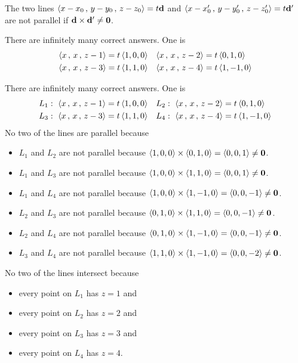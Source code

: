 \begin{hint}
The two lines $\left< x-x_0\,,\,y-y_0\,,\,z-z_0\right> =t\mathbf{d}$ and
$\left< x-x'_0\,,\,y-y'_0\,,\,z-z'_0\right> =t\mathbf{d}'$ are not parallel if
$\mathbf{d}\times\mathbf{d}'\ne\mathbf{0}$.
\end{hint}


\begin{answer}
There are infinitely many correct answers. One is
\begin{align*}
\left< x\,,\,x\,,\,z-1\right> &= t\left< 1,0,0\right> &
\left< x\,,\,x\,,\,z-2\right> &= t\left< 0,1,0\right> \\
\left< x\,,\,x\,,\,z-3\right> &= t\left< 1,1,0\right> &
\left< x\,,\,x\,,\,z-4\right> &= t\left< 1,-1,0\right> 
\end{align*}
 
\end{answer}
\begin{solution}
There are infinitely many correct answers. One is
\begin{align*}
L_1:\ \left< x\,,\,x\,,\,z-1\right> &= t\left< 1,0,0\right> &
L_2:\ \left< x\,,\,x\,,\,z-2\right> &= t\left< 0,1,0\right> \\
L_3:\ \left< x\,,\,x\,,\,z-3\right> &= t\left< 1,1,0\right> &
L_4:\ \left< x\,,\,x\,,\,z-4\right> &= t\left< 1,-1,0\right> 
\end{align*}
No two of the lines are parallel because
\begin{itemize}
\item
$L_1$ and $L_2$ are not parallel because
$\left< 1,0,0\right>\times \left< 0,1,0\right>=\left< 0,0,1\right>\ne\mathbf{0}$.
\item
$L_1$ and $L_3$ are not parallel because
$\left< 1,0,0\right>\times \left< 1,1,0\right>=\left< 0,0,1\right>\ne\mathbf{0}$.
\item
$L_1$ and $L_4$ are not parallel because
$\left< 1,0,0\right>\times \left< 1,-1,0\right>=\left< 0,0,-1\right>\ne\mathbf{0}$.
\item
$L_2$ and $L_3$ are not parallel because
$\left< 0,1,0\right>\times \left< 1,1,0\right>=\left< 0,0,-1\right>\ne\mathbf{0}$.
\item
$L_2$ and $L_4$ are not parallel because
$\left< 0,1,0\right>\times \left< 1,-1,0\right>=\left< 0,0,-1\right>\ne\mathbf{0}$.
\item
$L_3$ and $L_4$ are not parallel because
$\left< 1,1,0\right>\times \left< 1,-1,0\right>=\left< 0,0,-2\right>\ne\mathbf{0}$.
\end{itemize}
No two of the lines intersect because
\begin{itemize}
\item every point on $L_1$ has $z=1$ and
\item every point on $L_2$ has $z=2$ and
\item every point on $L_3$ has $z=3$ and
\item every point on $L_4$ has $z=4$.
\end{itemize}
\end{solution}


